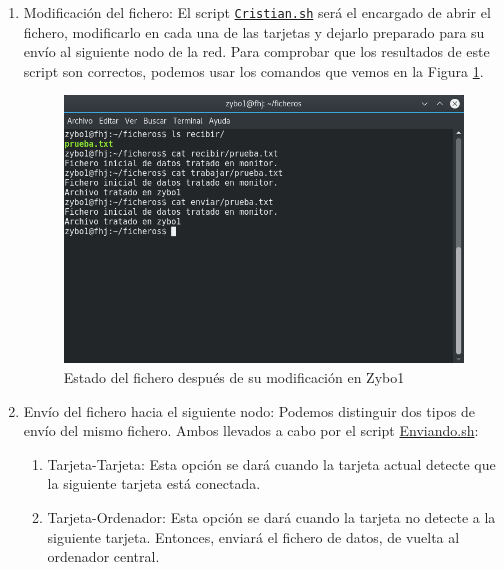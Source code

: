\begin{enumerate}
	\item Modificación del fichero: El script \hyperlink{ScriptCristian}{\texttt{Cristian.sh}} será el encargado de abrir el fichero, modificarlo en cada una de las tarjetas y dejarlo preparado para su envío al siguiente nodo de la red. Para comprobar que los resultados de este script son correctos, podemos usar los comandos que vemos en la Figura \ref{Estado del fichero después de su modificación en Zybo1}.
	\begin{figure}[h]
		\centering
		\includegraphics[scale=0.5]{Metodologia/Pruebas/Fichero_en_Zybo1.png}
		\caption{Estado del fichero después de su modificación en Zybo1}
		\label{Estado del fichero después de su modificación en Zybo1}
	\end{figure}
\newpage
	\item Envío del fichero hacia el siguiente nodo: Podemos distinguir dos tipos de envío del mismo fichero. Ambos llevados a cabo por el script \hyperlink{ScriptEnviando}{Enviando.sh}:
	\begin{enumerate}
		\item Tarjeta-Tarjeta: Esta opción se dará cuando la tarjeta actual detecte que la siguiente tarjeta está conectada.
		\item Tarjeta-Ordenador: Esta opción se dará cuando la tarjeta no detecte a la siguiente tarjeta. Entonces, enviará el fichero de datos, de vuelta al ordenador central.
	\end{enumerate}


\end{enumerate}
